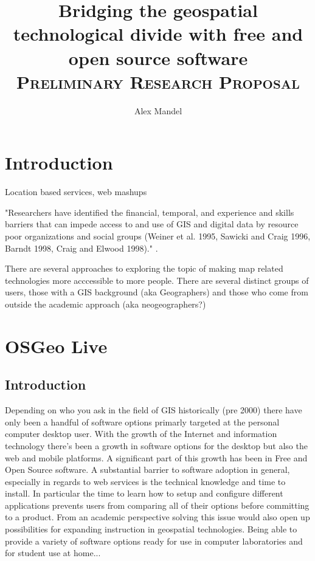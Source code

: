 \documentclass[12pt,letterpaper]{article}
\author{Alex Mandel}
\title{Bridging the geospatial technological divide with free and open source software
\\	
\textsc{\small Preliminary Research Proposal}\\[0.5cm]
}
\begin{document}
\maketitle

\section{Introduction}

Location based services, web mashups

"Researchers have identified the financial, temporal, and experience and skills barriers
that can impede access to and use of GIS and digital data by resource poor organizations
and social groups (Weiner et al. 1995, Sawicki and Craig 1996, Barndt 1998, Craig and
Elwood 1998)." \parencite{Elwood2006}.

There are several approaches to exploring the topic of making map related technologies more acccessible to more people. There are several distinct groups of users, those with a GIS background (aka Geographers) and those who come from outside the academic approach (aka neogeographers?)


\section{OSGeo Live}

\subsection{Introduction}
	Depending on who you ask in the field of GIS historically (pre 2000) there have only been a handful of software options primarly targeted at the personal computer desktop user. With the growth of the Internet and information technology there's been a growth in software options for the desktop but also the web and mobile platforms. A significant part of this growth has been in Free and Open Source software.
	A substantial barrier to software adoption in general, especially in regards to web services is the technical knowledge and time to install. In particular the time to learn how to setup and configure different applications prevents users from comparing all of their options before committing to a product. 
	From an academic perspective solving this issue would also open up possibilities for expanding instruction in geospatial technologies. Being able to provide a variety of software options ready for use in computer laboratories and for student use at home...
\end{document}
